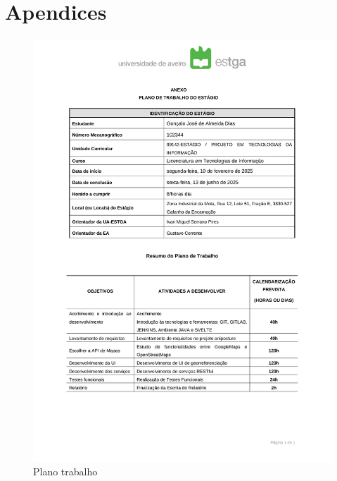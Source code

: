 \chapter{Apendices}

\begin{figure}[h!]
	\centering
    \includegraphics[width=\textwidth]{figs/plano.pdf}
    \caption[Plano trabalho]{Plano trabalho}
    \label{fig:work_plan}
\end{figure}